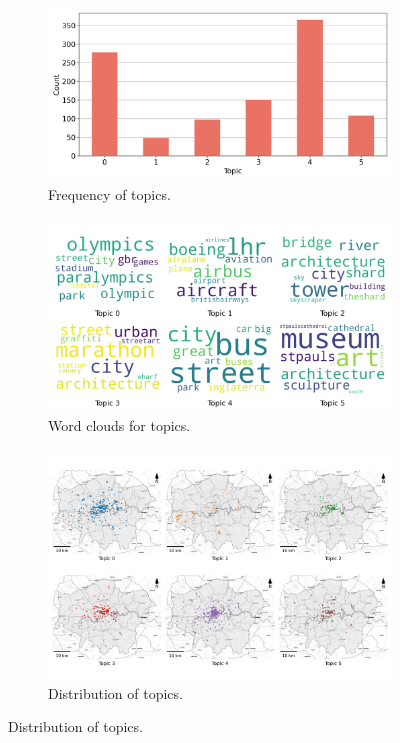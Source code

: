 \documentclass{article}
\theoremstyle{remark}
\begin{document}
\begin{figure}[!h]
    \centering
    \begin{subfigure}{0.45\textwidth}
        \centering
        \includegraphics[width=\linewidth]{figures/places_sense_daytime_tourists.png} 
        \caption{Frequency of topics.}
        \label{fig:places_sense_daytime_tourists}
    \end{subfigure}
    \hfill
    \begin{subfigure}{0.5\textwidth}
        \centering
        \includegraphics[width=\linewidth]{figures/topics_daytime_tourists.png} 
        \caption{Word clouds for topics.}
        \label{fig:topics_daytime_tourists}
    \end{subfigure}
    
    \begin{subfigure}{0.9\textwidth}
        \centering
        \includegraphics[width=\linewidth]{figures/topics_distribution_daytime_tourists.png} 
        \caption{Distribution of topics.}
        \label{fig:topics_distribution_daytime_tourists}
    \end{subfigure}


\end{figure}
\end{document}
